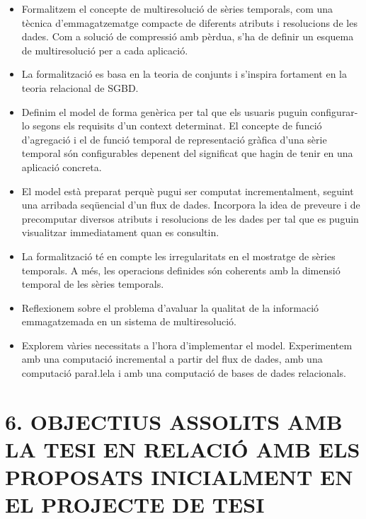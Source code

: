 \documentclass{article}
\begin{document}
\begin{itemize}
\item Formalitzem el concepte de multiresolució de sèries temporals,
  com una tècnica d'emmagatzematge compacte de diferents atributs i
  resolucions de les dades. Com a solució de compressió amb pèrdua,
  s'ha de definir un esquema de multiresolució per a cada aplicació.


\item La formalització es basa en la teoria de conjunts i s'inspira
  fortament en la teoria relacional de SGBD.

\item Definim el model de forma genèrica per tal que els usuaris
  puguin configurar-lo segons els requisits d'un context determinat.
  El concepte de funció d'agregació i el de funció temporal de
  representació gràfica d'una sèrie temporal són configurables
  depenent del significat que hagin de tenir en una aplicació
  concreta.

\item El model està preparat perquè pugui ser computat
  incrementalment, seguint una arribada seqüencial d'un flux de dades.
  Incorpora la idea de preveure i de precomputar diversos atributs i
  resolucions de les dades per tal que es puguin visualitzar immediatament
  quan es consultin.

\item La formalització té en compte les irregularitats en el mostratge de
  sèries temporals. A més, les operacions definides són coherents amb
  la dimensió temporal de les sèries temporals. 


\item Reflexionem sobre el problema d'avaluar la qualitat de la
  informació emmagatzemada en un sistema de multiresolució.


\item Explorem vàries necessitats a l'hora d'implementar el
  model. Experimentem amb una computació incremental a partir del flux
  de dades, amb una computació para\l.lela i amb una
  computació de bases de dades relacionals.


\end{itemize}



\section*{6. OBJECTIUS ASSOLITS AMB LA TESI EN RELACIÓ AMB ELS PROPOSATS INICIALMENT EN EL PROJECTE DE TESI}
\end{document}
